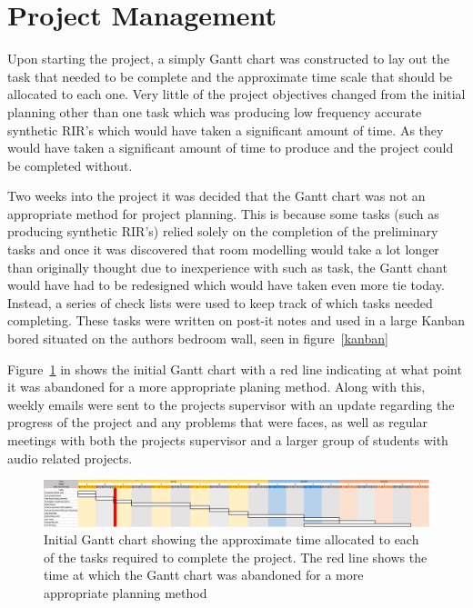 \documentclass[../../main.tex]{subfiles}
\begin{document}
\section{Project Management}
	Upon starting the project, a simply Gantt chart was constructed to lay out the task that needed to be complete and the approximate time scale that should be allocated to each one. Very little of the project objectives changed from the initial planning other than one task which was producing low frequency accurate synthetic \ac{RIR}'s which would have taken a significant amount of time. As they would have taken a significant amount of time to produce and the project could be completed without.

	Two weeks into the project it was decided that the Gantt chart was not an appropriate method for project planning. This is because some tasks (such as producing synthetic \ac{RIR}'s) relied solely on the completion of the preliminary tasks and once it was discovered that room modelling would take a lot longer than originally thought due to inexperience with such as task, the Gantt chant would have had to be redesigned which would have taken even more tie today. Instead, a series of check lists were used to keep track of which tasks needed completing. These tasks were written on post-it notes and used in a large Kanban bored situated on the authors bedroom wall, seen in figure~\ref{kanban}

	Figure~\ref{gantt} in  shows the initial Gantt chart with a red line indicating at what point it was abandoned for a more appropriate planing method. Along with this, weekly emails were sent to the projects supervisor with an update regarding the progress of the project and any problems that were faces, as well as regular meetings with both the projects supervisor and a larger group of students with audio related projects.


	\begin{center}
	\begin{figure}[H]
		\vspace{50mm}\centerline{\includegraphics[scale = 0.35]{Sections/ProjectManagement/images/Gantt.png}}
		\caption{Initial Gantt chart showing the approximate time allocated to each of the tasks required to complete the project. The red line shows the time at which the Gantt chart was abandoned for a more appropriate planning method}
		\label{gantt}
	\end{figure}
	\end{center}
\end{document}

